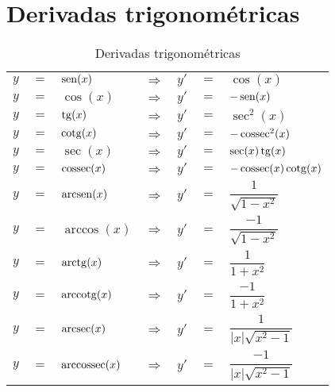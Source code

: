 \section{Derivadas trigonométricas}
	\begin{table}[htb]
		\caption{Derivadas trigonométricas}
		\label{derivadas_trigometricas}
		\centering
		\begin{tabular}{|lclclcl|}
			$y$ & $=$ & $\operatorname{sen}(x)$       & $\Rightarrow$ & $y'$ & $=$ & $\cos(x)$                       \\
			$y$ & $=$ & $\cos(x)$       & $\Rightarrow$ & $y'$ & $=$ & $-\operatorname{sen}(x)$                      \\
			$y$ & $=$ & $\operatorname{tg}(x)$        & $\Rightarrow$ & $y'$ & $=$ & $\sec^2(x)$                     \\
			$y$ & $=$ & $\operatorname{cotg}(x)$      & $\Rightarrow$ & $y'$ & $=$ & $-\operatorname{cossec}^2(x)$                 \\
			$y$ & $=$ & $\sec(x)$       & $\Rightarrow$ & $y'$ & $=$ & $\sec(x)\operatorname{tg}(x)$                 \\
			$y$ & $=$ & $\operatorname{cossec}(x)$    & $\Rightarrow$ & $y'$ & $=$ & $-\operatorname{cossec}(x)\operatorname{cotg}(x)$           \\
			$y$ & $=$ & $\operatorname{arcsen}(x)$    & $\Rightarrow$ & $y'$ & $=$ & $\dfrac{1}{\sqrt{1 - x^2}}$     \\
			$y$ & $=$ & $\arccos(x)$    & $\Rightarrow$ & $y'$ & $=$ & $\dfrac{-1}{\sqrt{1 - x^2}}$    \\
			$y$ & $=$ & $\operatorname{arctg}(x)$     & $\Rightarrow$ & $y'$ & $=$ & $\dfrac{1}{1 + x^2}$            \\
			$y$ & $=$ & $\operatorname{arccotg}(x)$   & $\Rightarrow$ & $y'$ & $=$ & $\dfrac{-1}{1 + x^2}$           \\
			$y$ & $=$ & $\operatorname{arcsec}(x)$    & $\Rightarrow$ & $y'$ & $=$ & $\dfrac{1}{|x|\sqrt{x^2 - 1}}$  \\
			$y$ & $=$ & $\operatorname{arccossec}(x)$ & $\Rightarrow$ & $y'$ & $=$ & $\dfrac{-1}{|x|\sqrt{x^2 - 1}}$
		\end{tabular}		
	\end{table}